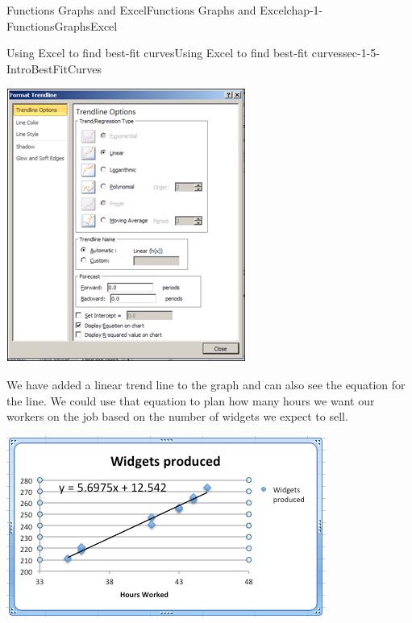 \documentclass[oneside,10pt,]{book}
\numberwithin{equation}{section}
\begin{document}
\begin{chapterptx}{Functions Graphs and Excel}{}{Functions Graphs and Excel}{}{}{chap-1-FunctionsGraphsExcel}
\begin{sectionptx}{Using Excel to find best-fit curves}{}{Using Excel to find best-fit curves}{}{}{sec-1-5-IntroBestFitCurves}
\begin{sidebyside}{1}{0.1}{0.1}{0}%
\begin{sbspanel}{0.8}%
\includegraphics[width=1\linewidth]{images/sec1-5-4.png}
\end{sbspanel}%
\end{sidebyside}%
%
\par
\hypertarget{p-382}{}%
We have added a linear trend line to the graph and can also see the equation for the line.  We could use that equation to plan how many hours we want our workers on the job based on the number of widgets we expect to sell. \leavevmode%
\begin{sidebyside}{1}{0.1}{0.1}{0}%
\begin{sbspanel}{0.8}%
\includegraphics[width=1\linewidth]{images/sec1-5-5.png}

\end{sbspanel}
\end{sidebyside}
\end{sectionptx}
\end{chapterptx}
\end{document}

